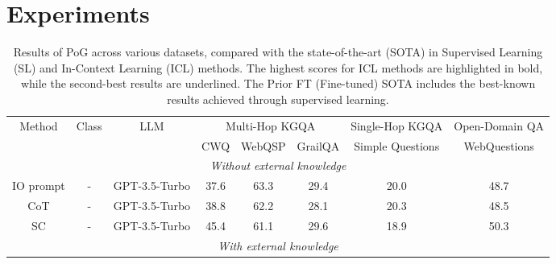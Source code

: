 

\section{Experiments}


\begin{table}[t]

\caption{Results of PoG across various datasets, compared with the state-of-the-art (SOTA) in Supervised Learning (SL) and In-Context Learning (ICL) methods. The highest scores for ICL methods are highlighted in bold, while the second-best results are underlined. The Prior FT (Fine-tuned) SOTA includes the best-known results achieved through supervised learning.}
\label{figure:mainresult}
\begin{tabular}{@{}cccccccc@{}}
\toprule
Method        & Class & LLM           & \multicolumn{3}{c}{Multi-Hop KGQA}   & Single-Hop KGQA  & Open-Domain QA \\ \cmidrule(lr){4-6}
              &       &               & CWQ  & WebQSP        & GrailQA       & Simple Questions & WebQuestions   \\ \midrule
\multicolumn{8}{c}{\textit{Without external knowledge}}                                                                   \\\midrule
IO prompt\cite{tog1.0sun2023think}     & -     & GPT-3.5-Turbo & 37.6 & 63.3          & 29.4          & 20.0               & 48.7           \\
CoT\cite{tog1.0sun2023think}            & -     & GPT-3.5-Turbo & 38.8 & 62.2          & 28.1          & 20.3             & 48.5           \\
SC\cite{tog1.0sun2023think}             & -     & GPT-3.5-Turbo & 45.4 & 61.1          & 29.6          & 18.9             & 50.3           \\ \midrule
\multicolumn{8}{c}{\textit{With external knowledge}}                                                                      \\ \midrule

\end{tabular}
\end{table}
